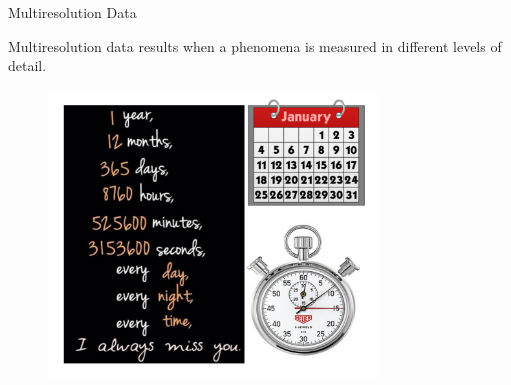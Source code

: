 \documentclass[first=dgreen,second=purple,logo=redexc]{aaltoslides}
\begin{document}
\begin{frame} {Multiresolution Data} 

\scriptsize  Multiresolution data results when a phenomena is measured in different levels of detail.

\vspace{-1mm}

\begin{figure}
\centering
  \includegraphics[trim=1cm 1cm 0cm 1cm, clip=true, width=0.78\textwidth]{figures/measure1}
\end{figure}

\vspace{-3mm}

\footnotesize





\end{frame}
% 
% 
% 
\end{document}
